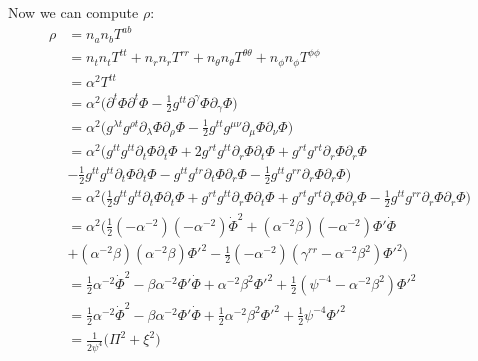 \documentclass[12pt]{article}
\numberwithin{equation}{section}
\begin{document}
Now we can compute $\rho$:
\begin{equation}
\begin{aligned}
\rho &= n_a n_b T^{ab} \\
&= n_t n_t T^{tt} + n_r n_r T^{rr} + n_\theta n_\theta T^{\theta \theta} + n_\phi n_\phi T^{\phi \phi} \\
&= \alpha^{2} T^{tt} \\
&= \alpha^{2} \Big( \partial^t \Phi \partial^t \Phi - \frac{1}{2} g^{t t} \partial^\gamma \Phi \partial_\gamma \Phi \Big) \\
&= \alpha^{2} \Big( g^{\lambda t} g^{\rho t} \partial_\lambda \Phi \partial_\rho \Phi - \frac{1}{2} g^{t t} g^{\mu \nu} \partial_{\mu} \Phi \partial_{\nu} \Phi \Big) \\
&= \alpha^{2} \Big( g^{t t} g^{t t} \partial_t \Phi \partial_t \Phi + 2 g^{r t} g^{t t} \partial_r \Phi \partial_t \Phi + g^{r t} g^{r t} \partial_r \Phi \partial_r \Phi \\
&- \frac{1}{2} g^{t t} g^{t t} \partial_{t} \Phi \partial_{t} \Phi - g^{t t} g^{t r} \partial_{t} \Phi \partial_{r} \Phi - \frac{1}{2} g^{t t} g^{r r} \partial_{r} \Phi \partial_{r} \Phi \Big) \\
&= \alpha^{2} \Big( \frac{1}{2} g^{t t} g^{t t} \partial_t \Phi \partial_t \Phi + g^{r t} g^{t t} \partial_r \Phi \partial_t \Phi + g^{r t} g^{r t} \partial_r \Phi \partial_r \Phi - \frac{1}{2} g^{t t} g^{r r} \partial_{r} \Phi \partial_{r} \Phi \Big) \\
&= \alpha^{2} \Big( \frac{1}{2} (-\alpha^{-2}) (-\alpha^{-2}) \dot{\Phi}^2 + (\alpha^{-2} \beta) (-\alpha^{-2}) \Phi' \dot{\Phi} \\
&+ (\alpha^{-2} \beta) (\alpha^{-2} \beta) \Phi'^2 - \frac{1}{2} (-\alpha^{-2}) (\gamma^{rr} - \alpha^{-2} \beta^2) \Phi'^2 \Big) \\
&= \frac{1}{2} \alpha^{-2} \dot{\Phi}^2 - \beta \alpha^{-2} \Phi' \dot{\Phi} + \alpha^{-2} \beta^2 \Phi'^2 + \frac{1}{2} (\psi^{-4} - \alpha^{-2} \beta^2) \Phi'^2 \\
&= \frac{1}{2} \alpha^{-2} \dot{\Phi}^2 - \beta \alpha^{-2} \Phi' \dot{\Phi} + \frac{1}{2} \alpha^{-2} \beta^2 \Phi'^2 + \frac{1}{2} \psi^{-4} \Phi'^2 \\
&= \frac{1}{2 \psi^{4}} \Big( \Pi^2 + \xi^2 \Big) \\
\end{aligned}
\end{equation}
\end{document}
